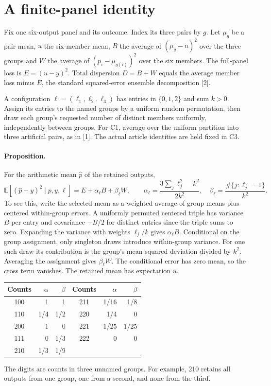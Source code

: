 \documentclass[11pt]{article}
\begin{document}
\section{A finite-panel identity}
Fix one six-output panel and its outcome. Index its three pairs by $g$. Let $\mu_g$ be a pair mean, $u$ the six-member mean, $B$ the average of $(\mu_g-u)^2$ over the three groups and $W$ the average of $(p_i-\mu_{g(i)})^2$ over the six members. The full-panel loss is $E=(u-y)^2$. Total dispersion $D=B+W$ equals the average member loss minus $E$, the standard squared-error ensemble decomposition [2].

A configuration $\ell=(\ell_1,\ell_2,\ell_3)$ has entries in $\{0,1,2\}$ and sum $k>0$. Assign its entries to the named groups by a uniform random permutation, then draw each group's requested number of distinct members uniformly, independently between groups. For C1, average over the uniform partition into three artificial pairs, as in [1]. The actual article identities are held fixed in C3.

\paragraph{Proposition.} For the arithmetic mean $\hat p$ of the retained outputs,
\[
 \mathbb E[(\hat p-y)^2\mid p,y,\ell]=E+\alpha_\ell B+\beta_\ell W,\qquad
 \alpha_\ell=\frac{3\sum_j\ell_j^2-k^2}{2k^2},\quad
 \beta_\ell=\frac{\#\{j:\ell_j=1\}}{k^2}.
\]
To see this, write the selected mean as a weighted average of group means plus centered within-group errors. A uniformly permuted centered triple has variance $B$ per entry and covariance $-B/2$ for distinct entries since the triple sums to zero. Expanding the variance with weights $\ell_j/k$ gives $\alpha_\ell B$. Conditional on the group assignment, only singleton draws introduce within-group variance. For one such draw its contribution is the group's mean squared deviation divided by $k^2$. Averaging the assignment gives $\beta_\ell W$. The conditional error has zero mean, so the cross term vanishes. The retained mean has expectation $u$.

\begin{center}
\begin{tabular}{crr@{\qquad}crr}
\toprule
Counts&$\alpha$&$\beta$& Counts&$\alpha$&$\beta$\\\midrule
100&1&1&211&1/16&1/8\\
110&1/4&1/2&220&1/4&0\\
200&1&0&221&1/25&1/25\\
111&0&1/3&222&0&0\\
210&1/3&1/9&&&\\\bottomrule
\end{tabular}
\end{center}
The digits are counts in three unnamed groups. For example, 210 retains all outputs from one group, one from a second, and none from the third.
\newpage
\end{document}
